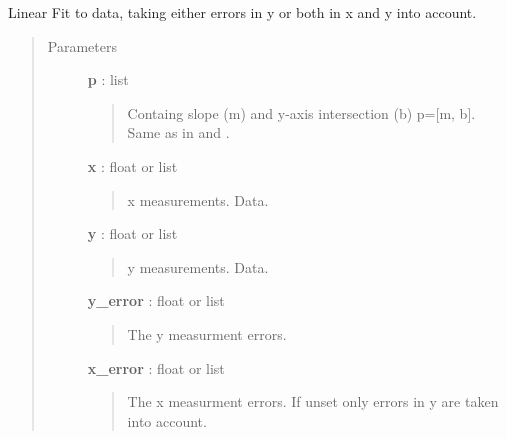 \documentclass[a4paper,10pt,english]{sphinxmanual}
\begin{document}
\begin{fulllineitems}
\label{functions:astrolyze.functions.astro_functions.line_fit}
Linear Fit to data, taking either errors in y or both in x and y into
account.
\begin{quote}\begin{description}
\item[{Parameters }] \leavevmode
\textbf{p} : list
\begin{quote}

Containg slope (m) and y-axis intersection (b) p={[}m, b{]}. Same as in
{\hyperref[functions:astrolyze.functions.astro_functions.line]{}} and .
\end{quote}

\textbf{x} : float or list
\begin{quote}

x measurements. Data.
\end{quote}

\textbf{y} : float or list
\begin{quote}

y measurements. Data.
\end{quote}

\textbf{y\_error} : float or list
\begin{quote}

The y measurment errors.
\end{quote}

\textbf{x\_error} : float or list
\begin{quote}

The x measurment errors. If unset only errors in y are taken into
account.
\end{quote}

\end{description}\end{quote}

\end{fulllineitems}

\end{document}
